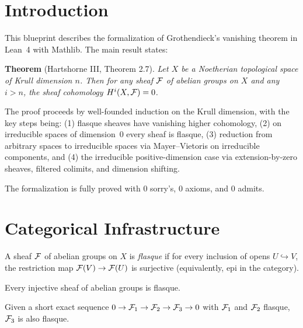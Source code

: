 
\chapter{Introduction}

This blueprint describes the formalization of Grothendieck's vanishing theorem
in Lean~4 with Mathlib. The main result states:

\medskip
\noindent\textbf{Theorem} (Hartshorne III, Theorem 2.7).
\emph{Let $X$ be a Noetherian topological space of Krull dimension $n$.
Then for any sheaf $\mathcal{F}$ of abelian groups on $X$ and any $i > n$,
the sheaf cohomology $H^i(X, \mathcal{F}) = 0$.}
\medskip

The proof proceeds by well-founded induction on the Krull dimension, with the
key steps being: (1) flasque sheaves have vanishing higher cohomology,
(2) on irreducible spaces of dimension~0 every sheaf is flasque,
(3) reduction from arbitrary spaces to irreducible spaces via
Mayer--Vietoris on irreducible components, and (4) the irreducible
positive-dimension case via extension-by-zero sheaves, filtered colimits,
and dimension shifting.

The formalization is fully proved with 0 sorry's, 0 axioms, and 0 admits.


\chapter{Categorical Infrastructure}\label{ch:infrastructure}

\begin{definition}\label{def:isFlasqueSheaf}
  \leanok
  A sheaf $\mathcal{F}$ of abelian groups on $X$ is \emph{flasque} if for every
  inclusion of opens $U \hookrightarrow V$, the restriction map
  $\mathcal{F}(V) \to \mathcal{F}(U)$ is surjective (equivalently, epi in the category).
\end{definition}

\begin{lemma}\label{lem:isFlasque_of_injective}
  \leanok
  Every injective sheaf of abelian groups is flasque.
\end{lemma}

\begin{lemma}\label{lem:isFlasque_X3_of_shortExact}
  \leanok
  Given a short exact sequence $0 \to \mathcal{F}_1 \to \mathcal{F}_2 \to \mathcal{F}_3 \to 0$
  with $\mathcal{F}_1$ and $\mathcal{F}_2$ flasque, $\mathcal{F}_3$ is also flasque.
\end{lemma}


